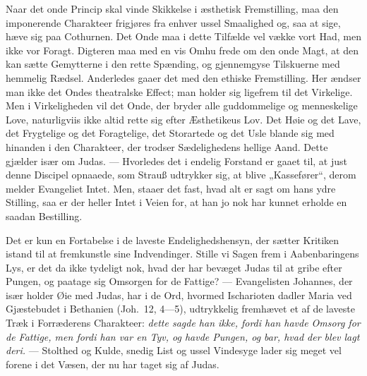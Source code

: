 \documentclass[12pt,a4paper]{book}
\begin{document}
Naar det onde Princip skal vinde Skikkelse i æsthetisk Fremstilling, maa den imponerende
Charakteer frigjøres fra enhver ussel Smaalighed og, saa at sige, hæve sig paa Cothurnen. Det
Onde maa i dette Tilfælde vel vække vort Had, men ikke vor Foragt. Digteren maa med en vis
Omhu frede om den onde Magt, at den kan sætte Gemytterne i den rette Spænding, og gjennemgyse
Tilskuerne med hemmelig Rædsel. Anderledes gaaer det med den ethiske Fremstilling. Her ændser
man ikke det Ondes theatralske Effect; man holder sig ligefrem til det Virkelige. Men i
Virkeligheden vil det Onde, der bryder alle guddommelige og menneskelige Love, naturligviis
ikke altid rette sig efter Æsthetikeus Lov. Det Høie og det Lave, det Frygtelige og det
Foragtelige, det Storartede og det Usle blande sig med hinanden i den Charakteer, der trodser
Sædelighedens hellige Aand. Dette gjælder især om Judas. --- Hvorledes det i endelig Forstand
er gaaet til, at just denne Discipel opnaaede, som Strauß udtrykker sig, at blive
„Kassefører“, derom melder Evangeliet Intet. Men, staaer det fast, hvad alt er sagt
om hans ydre Stilling, saa er der heller Intet i Veien for, at han jo nok har kunnet erholde
en saadan Bestilling.

Det er kun en Fortabelse i de laveste Endelighedshensyn, der sætter Kritiken istand til at
fremkunstle sine Indvendinger. Stille vi Sagen frem i Aabenbaringens Lys, er det da ikke
tydeligt nok, hvad der har bevæget Judas til at gribe efter Pungen, og paatage sig Omsorgen
for de Fattige? --- Evangelisten Johannes, der især holder Øie med Judas, har i de Ord,
hvormed Ischarioten dadler Maria ved Gjæstebudet i Bethanien (Joh.\ 12, 4---5), udtrykkelig
fremhævet et af de laveste Træk i Forræderens Charakteer: \emph{dette sagde han ikke, fordi
han havde Omsorg for de Fattige, men fordi han var en Tyv, og havde Pungen, og bar, hvad der
blev lagt deri.} --- Stolthed og Kulde, snedig List og ussel Vindesyge lader sig meget vel
forene i det Væsen, der nu har taget sig af Judas.
\end{document}

